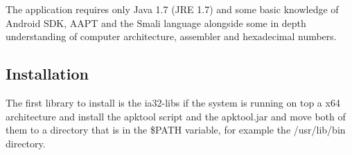The application requires only Java 1.7 (JRE 1.7) and some basic knowledge of Android SDK, AAPT and the Smali language alongside some in depth understanding of computer architecture, assembler and hexadecimal numbers.

\subsection{Installation}

 The first library to install is the ia32-libs if the system is running on top a x64 architecture and install the apktool script and the apktool.jar and move both of them to a directory that is in the \$PATH variable, for example the /usr/lib/bin directory.





